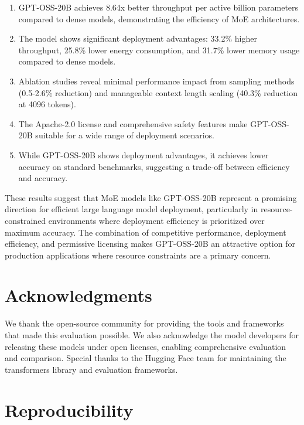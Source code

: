 \documentclass[11pt]{article}
\begin{document}
\begin{enumerate}
    \item GPT-OSS-20B achieves 8.64x better throughput per active billion parameters compared to dense models, demonstrating the efficiency of MoE architectures.
    
    \item The model shows significant deployment advantages: 33.2\% higher throughput, 25.8\% lower energy consumption, and 31.7\% lower memory usage compared to dense models.
    
    \item Ablation studies reveal minimal performance impact from sampling methods (0.5-2.6\% reduction) and manageable context length scaling (40.3\% reduction at 4096 tokens).
    
    \item The Apache-2.0 license and comprehensive safety features make GPT-OSS-20B suitable for a wide range of deployment scenarios.
    
    \item While GPT-OSS-20B shows deployment advantages, it achieves lower accuracy on standard benchmarks, suggesting a trade-off between efficiency and accuracy.
\end{enumerate}

These results suggest that MoE models like GPT-OSS-20B represent a promising direction for efficient large language model deployment, particularly in resource-constrained environments where deployment efficiency is prioritized over maximum accuracy. The combination of competitive performance, deployment efficiency, and permissive licensing makes GPT-OSS-20B an attractive option for production applications where resource constraints are a primary concern.

\section*{Acknowledgments}

We thank the open-source community for providing the tools and frameworks that made this evaluation possible. We also acknowledge the model developers for releasing these models under open licenses, enabling comprehensive evaluation and comparison. Special thanks to the Hugging Face team for maintaining the transformers library and evaluation frameworks.

\section*{Reproducibility}
\end{document}
